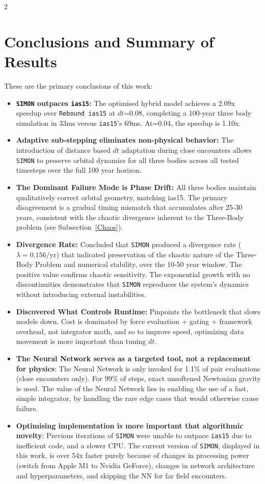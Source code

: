 \documentclass{article}
\begin{document}
\begin{multicols}{2}
\section{Conclusions and Summary of Results}
These are the primary conclusions of this work:
\begin{itemize}
    \item \textbf{\texttt{SIMON} outpaces \texttt{ias15}:} The optimised hybrid model achieves a 2.09x speedup over \texttt{Rebound ias15} at $dt$=0.08, completing a 100-year three body simulation in 33ms versus \texttt{ias15}'s 69ms. At=0.04, the speedup is 1.10x.
    \item \textbf{Adaptive sub-stepping eliminates non-physical behavior:} The introduction of distance based $dt$ adaptation during close encounters allows \texttt{SIMON} to preserve orbital dynamics for all three bodies across all tested timesteps over the full 100 year horizon.
    \item \textbf{The Dominant Failure Mode is Phase Drift:} All three bodies maintain qualitatively correct orbital geometry, matching ias15. The primary disagreement is a gradual timing mismatch that accumulates after 25-30 years, consistent with the chaotic divergence inherent to the Three-Body problem (see Subsection~\ref{Chaos}).
    \item \textbf{Divergence Rate:} Concluded that \texttt{SIMON} produced a divergence rate ($\lambda=0.156$/yr) that indicated preservation of the chaotic nature of the Three-Body Problem and numerical stability, over the 10-50 year window. The positive value confirms chaotic sensitivity. The exponential growth with no discontinuities demonstrates that \texttt{SIMON} reproduces the system's dynamics without introducing external instabilities.
    \item \textbf{Discovered What Controls Runtime:} Pinpoints the bottleneck that slows models down. Cost is dominated by force evaluation + gating + framework overhead, not integrator math, and so to improve speed, optimizing data movement is more important than tuning $dt$.
    \item \textbf{The Neural Network serves as a targeted tool, not a replacement for physics}: The Neural Network is only invoked for 1.1\% of pair evaluations (close encounters only). For 99\% of steps, exact unsoftened Newtonian gravity is used. The value of the Neural Network lies in enabling the use of a fast, simple integrator, by handling the rare edge cases that would otherwise cause failure.
    \item \textbf{Optimising implementation is more important that algorithmic novelty}: Previous iterations of \texttt{SIMON} were unable to outpace \texttt{ias15} due to inefficient code, and a slower CPU. The current version of \texttt{SIMON}, displayed in this work, is over 54x faster purely because of changes in processing power (switch from Apple M1 to Nvidia GeForce), changes in network architecture and hyperparameters, and skipping the NN for far field encounters.

\end{itemize}
\end{multicols}
\end{document}
